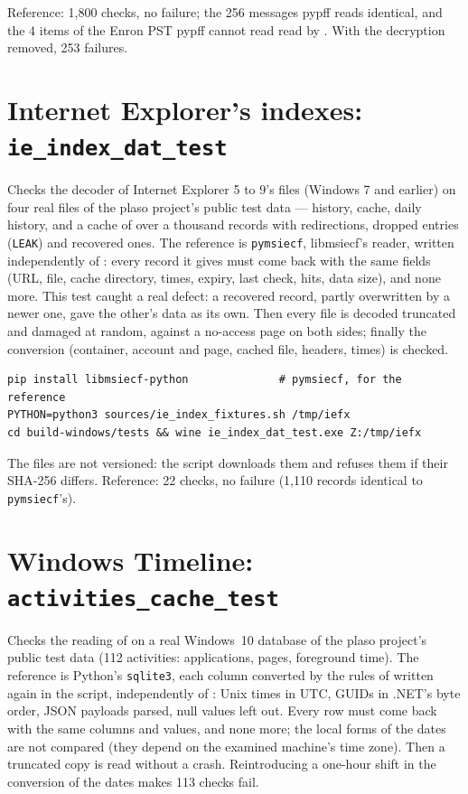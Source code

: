 \documentclass[11pt,a4paper,oneside]{report}
\begin{document}
Reference: 1,800 checks, no failure; the 256 messages pypff reads identical,
and the 4 items of the Enron PST pypff cannot read read by \wac{}. With the
decryption removed, 253 failures.

\section{Internet Explorer's indexes: \texttt{ie\_index\_dat\_test}}

Checks the decoder of Internet Explorer 5 to 9's  files
(Windows 7 and earlier) on four real files of the plaso project's public test
data — history, cache, daily history, and a cache of over a thousand records
with redirections, dropped entries (\texttt{LEAK}) and recovered ones. The
reference is \texttt{pymsiecf}, libmsiecf's reader, written independently of
\wac{}: every record it gives must come back with the same fields (URL, file,
cache directory, times, expiry, last check, hits, data size), and none more.
This test caught a real defect: a recovered record, partly overwritten by a
newer one, gave the other's data as its own. Then every file is decoded
truncated and damaged at random, against a no-access page on both sides;
finally the conversion (container, account and page, cached file, headers,
times) is checked.

\begin{lstlisting}
pip install libmsiecf-python              # pymsiecf, for the reference
PYTHON=python3 sources/ie_index_fixtures.sh /tmp/iefx
cd build-windows/tests && wine ie_index_dat_test.exe Z:/tmp/iefx
\end{lstlisting}

The files are not versioned: the script downloads them and refuses them if
their SHA-256 differs. Reference: 22 checks, no failure (1,110 records
identical to \texttt{pymsiecf}'s).

\section{Windows Timeline: \texttt{activities\_cache\_test}}

Checks the reading of  on a real Windows~10
database of the plaso project's public test data (112 activities:
applications, pages, foreground time). The reference is Python's
\texttt{sqlite3}, each column converted by the rules of
 written again in the script, independently of
\wac{}: Unix times in UTC, GUIDs in .NET's byte order, JSON payloads parsed,
null values left out. Every row must come back with the same columns and
values, and none more; the local forms of the dates are not compared (they
depend on the examined machine's time zone). Then a truncated copy is read
without a crash. Reintroducing a one-hour shift in the conversion of the
dates makes 113 checks fail.
\end{document}
